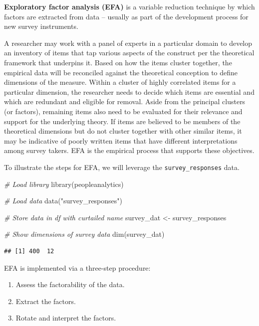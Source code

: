 \documentclass[
]{book}
\newenvironment{Shaded}{\begin{snugshade}}{\end{snugshade}}
\newcommand{\CommentTok}[1]{\textcolor[rgb]{0.56,0.35,0.01}{\textit{#1}}}
\newcommand{\FunctionTok}[1]{\textcolor[rgb]{0.00,0.00,0.00}{#1}}
\newcommand{\NormalTok}[1]{#1}
\newcommand{\OtherTok}[1]{\textcolor[rgb]{0.56,0.35,0.01}{#1}}
\newcommand{\StringTok}[1]{\textcolor[rgb]{0.31,0.60,0.02}{#1}}
\providecommand{\tightlist}{%
  \setlength{\itemsep}{0pt}\setlength{\parskip}{0pt}}
\begin{document}
\textbf{Exploratory factor analysis (EFA)} is a variable reduction technique by which factors are extracted from data -- usually as part of the development process for new survey instruments.

A researcher may work with a panel of experts in a particular domain to develop an inventory of items that tap various aspects of the construct per the theoretical framework that underpins it. Based on how the items cluster together, the empirical data will be reconciled against the theoretical conception to define dimensions of the measure. Within a cluster of highly correlated items for a particular dimension, the researcher needs to decide which items are essential and which are redundant and eligible for removal. Aside from the principal clusters (or factors), remaining items also need to be evaluated for their relevance and support for the underlying theory. If items are believed to be members of the theoretical dimensions but do not cluster together with other similar items, it may be indicative of poorly written items that have different interpretations among survey takers. EFA is the empirical process that supports these objectives.

To illustrate the steps for EFA, we will leverage the \texttt{survey\_responses} data.

\begin{Shaded}
\begin{Highlighting}[]
\CommentTok{\# Load library}
\FunctionTok{library}\NormalTok{(peopleanalytics)}

\CommentTok{\# Load data}
\FunctionTok{data}\NormalTok{(}\StringTok{"survey\_responses"}\NormalTok{)}

\CommentTok{\# Store data in df with curtailed name}
\NormalTok{survey\_dat }\OtherTok{\textless{}{-}}\NormalTok{ survey\_responses}

\CommentTok{\# Show dimensions of survey data}
\FunctionTok{dim}\NormalTok{(survey\_dat)}
\end{Highlighting}
\end{Shaded}

\begin{verbatim}
## [1] 400  12
\end{verbatim}

EFA is implemented via a three-step procedure:

\begin{enumerate}
\def\labelenumi{\arabic{enumi}.}
\tightlist
\item
  Assess the factorability of the data.
\item
  Extract the factors.
\item
  Rotate and interpret the factors.
\end{enumerate}
\end{document}
